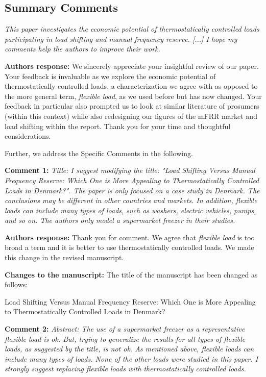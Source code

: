 \documentclass[10pt]{article}
\newcommand{\nt}[1]{\textcolor{newtextcolor}{#1}}
\newcommand{\auth}{\textbf{Authors response: }}
\newcommand{\changes}{\textbf{Changes to the manuscript: }}
\begin{document}
\subsection{Summary Comments} \label{rl_sec:rev2_summary_comms}

\textit{This paper investigates the economic potential of thermostatically controlled loads participating in load shifting and manual frequency reserve. [...] I hope my comments help the authors to improve their work. }

\auth We sincerely appreciate your insightful review of our paper. Your feedback is invaluable as we explore the economic potential of thermostatically controlled loads, a characterization we agree with as opposed to the more general term, \textit{flexible load}, as we used before but has now changed. Your feedback in particular also prompted us to look at similar literature of prosumers (within this context) while also redesigning our figures of the mFRR market and load shifting within the report. Thank you for your time and thoughtful considerations.

Further, we address the Specific Comments in the following.

\textbf{Comment 1:} \textit{Title: I suggest modifying the title: "Load Shifting Versus Manual Frequency Reserve: Which One is More Appealing to Thermostatically Controlled Loads in Denmark?". The paper is only focused on a case study in Denmark. The conclusions may be different in other countries and markets. In addition, flexible loads can include many types of loads, such as washers, electric vehicles, pumps, and so on. The authors only model a supermarket freezer in their studies.}

\auth Thank you for comment. We agree that \textit{flexible load} is too broad a term and it is better to use thermostatically controlled loads. We made this change in the revised manuscript. 

\changes The title of the manuscript has been changed as follows:

\nt{Load Shifting Versus Manual Frequency Reserve:  Which One is More Appealing to Thermostatically Controlled Loads in Denmark?}

\textbf{Comment 2:} \textit{Abstract: The use of a supermarket freezer as a representative flexible load is ok. But, trying to generalize the results for all types of flexible loads, as suggested by the title, is not ok. As mentioned above, flexible loads can include many types of loads. None of the other loads were studied in this paper. I strongly suggest replacing flexible loads with thermostatically controlled loads.}
\end{document}

